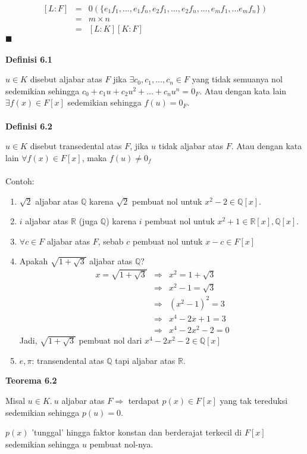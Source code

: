 	$$\begin{array}{rcl}
	[L:F]&=&0(\{e_1f_1,...,e_1f_n,e_2f_1,...,e_2f_n,...,e_mf_1,...e_mf_n\})
	\\ &=&m \times n
	\\ &=&[L:K][K:F]
	\end{array}$$
$\blacksquare$
\\
\\
\textbf{Definisi 6.1}
\par 	 $u \in K$ disebut aljabar atas $F$ jika $\exists c_0,c_1,...,c_n \in F$ yang tidak semuanya nol sedemikian sehingga $c_0+c_1u+c_2u^2+...+c_nu^n=0_F$. Atau dengan kata lain $\exists f(x) \in F[x]$ sedemikian sehingga $f(u)=0_F$.
\\
\\
\textbf{Definisi 6.2}
\par 	$u \in K$ disebut transedental atas $F$, jika $u$ tidak aljabar atas $F$. Atau dengan kata lain $\forall f(x) \in F[x]$, maka $f(u) \ne 0_f$
\\
\\ Contoh:
\begin{enumerate}
\item $\sqrt{2}$ aljabar atas $\mathbb{Q}$ karena $\sqrt{2}$ pembuat nol untuk $x^2-2 \in \mathbb{Q}[x]$.
\item $i$ aljabar atas $\mathbb{R}$ (juga $\mathbb{Q}$) karena $i$ pembuat nol untuk $x^2+1 \in \mathbb{R}[x],\mathbb{Q}[x]$.
\item $\forall c \in F$ aljabar atas $F$, sebab $c$ pembuat nol untuk $x-c \in F[x]$
\item Apakah $\sqrt{1+\sqrt{3}}$ aljabar atas $\mathbb{Q}$?
$$\begin{array}{rcl}
 x=\sqrt{1+\sqrt{3}} &\Rightarrow& x^2=1+\sqrt{3}
\\ &\Rightarrow&x^2-1=\sqrt{3}
\\ &\Rightarrow&(x^2-1)^2=3
\\ &\Rightarrow&x^4-2x+1=3
\\ &\Rightarrow&x^4-2x^2-2=0
\end{array}$$
Jadi, $\sqrt{1+\sqrt{3}}$ pembuat nol dari $x^4-2x^2-2 \in \mathbb{Q}[x]$ 
\item $e,\pi$: transendental atas $\mathbb{Q}$ tapi aljabar atas $\mathbb{R}$.
\end{enumerate}
\textbf{Teorema 6.2}
\par Misal $u \in K.~u$ aljabar atas $F \Rightarrow $ terdapat $p(x) \in F[x]$ yang tak tereduksi sedemikian sehingga  $p(u)=0$.
\par $p(x)$ 'tunggal' hingga faktor konstan dan berderajat terkecil di $F[x]$ sedemikian sehingga $u$ pembuat nol-nya.
